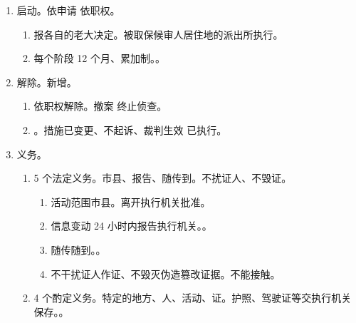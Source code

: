 \begin{enumerate}
\begin{enumerate}
\begin{enumerate}
                \end{enumerate}
          \item 保证金。
                \begin{enumerate}
                  \item 起点 1000￥，上不封顶，直接交到指定的银行账户。。
                  \item 违反义务 \yjt 没收。
                  \item 实施新的犯罪，先暂扣。\yi 故意 \yjt 没收。\er 其他 \yjt 退还。。
                  \item 金额的确定。删除了的规定。
                \end{enumerate}
        \end{enumerate}
  \item 启动。依申请 \hz 依职权。
        \begin{enumerate}
          \item 报各自的老大决定。被取保候审人居住地的派出所执行。
          \item 每个阶段 12 个月、累加制。。
        \end{enumerate}
  \item 解除。新增。
        \begin{enumerate}
          \item 依职权解除。撤案 \hz 终止侦查。
          \item {}。措施已变更、不起诉、裁判生效 \hz 已执行。
        \end{enumerate}
  \item 义务。
        \begin{enumerate}
          \item 5 个法定义务。市县、报告、随传到。不扰证人、不毁证。
                \begin{enumerate}
                  \item 活动范围市县。离开执行机关批准。
                  \item 信息变动 24 小时内报告执行机关。。
                  \item 随传随到。。
                  \item 不干扰证人作证、不毁灭伪造篡改证据。\bdy 不能接触。
                \end{enumerate}
          \item 4 个酌定义务。特定的地方、人、活动、证。护照、驾驶证等交执行机关保存。。

\end{enumerate}
\end{enumerate}
